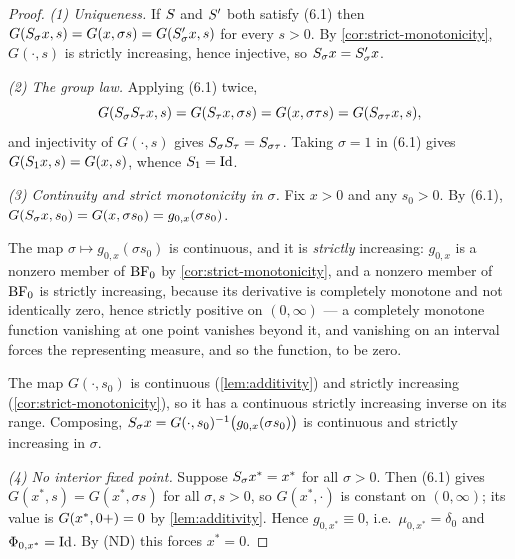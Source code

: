 \begin{proof}
\leanok
\emph{(1) Uniqueness.} If $S$ and $S'$ both satisfy (6.1) then
$G(S_\sigma x, s) = G(x,\sigma s) = G(S'_\sigma x, s)$ for every $s > 0$. By
\ref{cor:strict-monotonicity}, $G(\cdot, s)$ is strictly increasing, hence injective, so
$S_\sigma x = S'_\sigma x$.

\emph{(2) The group law.} Applying (6.1) twice,
\[
  G(S_\sigma S_\tau x, s) = G(S_\tau x, \sigma s) = G(x, \sigma\tau s)
  = G(S_{\sigma\tau} x, s),
\]
and injectivity of $G(\cdot,s)$ gives $S_\sigma S_\tau = S_{\sigma\tau}$. Taking
$\sigma = 1$ in (6.1) gives $G(S_1 x, s) = G(x,s)$, whence $S_1 = \mathrm{Id}$.

\emph{(3) Continuity and strict monotonicity in $\sigma$.} Fix $x > 0$ and any $s_0 > 0$. By
(6.1), $G(S_\sigma x, s_0) = G(x, \sigma s_0) = g_{0,x}(\sigma s_0)$.

The map $\sigma \mapsto g_{0,x}(\sigma s_0)$ is continuous, and it is \emph{strictly}
increasing: $g_{0,x}$ is a nonzero member of $\mathrm{BF}_0$ by \ref{cor:strict-monotonicity}, and a
nonzero member of $\mathrm{BF}_0$ is strictly increasing, because its derivative is completely monotone
and not identically zero, hence strictly positive on $(0,\infty)$ --- a completely monotone
function vanishing at one point vanishes beyond it, and vanishing on an interval forces the
representing measure, and so the function, to be zero.

The map $G(\cdot, s_0)$ is continuous (\ref{lem:additivity}) and strictly increasing
(\ref{cor:strict-monotonicity}), so it has a continuous strictly increasing inverse on its
range. Composing,
$S_\sigma x = G(\cdot,s_0)^{-1}\bigl(g_{0,x}(\sigma s_0)\bigr)$ is continuous and strictly
increasing in $\sigma$.

\emph{(4) No interior fixed point.} Suppose $S_\sigma x^* = x^*$ for all $\sigma > 0$.
Then (6.1) gives $G(x^*, s) = G(x^*, \sigma s)$ for all $\sigma, s > 0$, so $G(x^*, \cdot)$ is
constant on $(0,\infty)$; its value is $G(x^*, 0{+}) = 0$ by \ref{lem:additivity}. Hence
$g_{0,x^*} \equiv 0$, i.e.\ $\mu_{0,x^*} = \delta_0$ and $\Phi_{0,x^*} = \mathrm{Id}$. By (ND) this
forces $x^* = 0$.
\end{proof}

